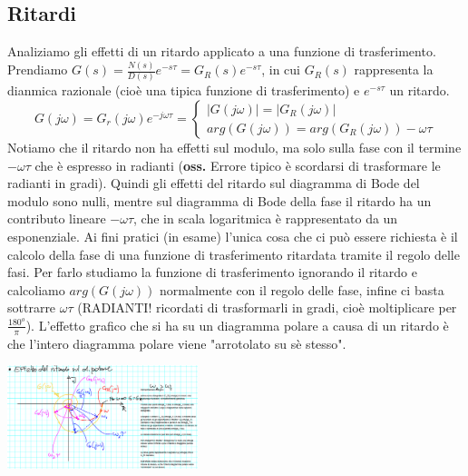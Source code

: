 \begin{landscape}
\begin{multicols*}{3}
    \subsection*{Ritardi}
    Analiziamo gli effetti di un ritardo applicato a una funzione di trasferimento. Prendiamo $G(s) = \frac{N(s)}{D(s)} e^{-s \tau} = G_R(s) e^{-s \tau}$, in cui $G_R(s)$ rappresenta la dianmica razionale (cioè una tipica funzione di trasferimento) e $e^{-s \tau}$ un ritardo.
        \[
            G(j \omega) = G_r(j \omega) e^{- j \omega \tau} = \begin{cases}
                |G(j \omega)| = |G_R(j \omega)|\\
                arg(G(j \omega)) = arg(G_R(j \omega)) - \omega \tau
            \end{cases}
        \]
        Notiamo che il ritardo non ha effetti sul modulo, ma solo sulla fase con il termine $- \omega \tau$ che è espresso in radianti (\textbf{oss.} Errore tipico è scordarsi di trasformare le radianti in gradi).\newline
        Quindi gli effetti del ritardo sul diagramma di Bode del modulo sono nulli, mentre sul diagramma di Bode della fase il ritardo ha un contributo lineare $- \omega \tau$, che in scala logaritmica è rappresentato da un esponenziale.\newline
        \newline
        Ai fini pratici (in esame) l'unica cosa che ci può essere richiesta è il calcolo della fase di una funzione di trasferimento ritardata tramite il regolo delle fasi. Per farlo studiamo la funzione di trasferimento ignorando il ritardo e calcoliamo $arg(G(j \omega))$ normalmente con il regolo delle fase, infine ci basta sottrarre $\omega \tau$ (RADIANTI! ricordati di trasformarli in gradi, cioè moltiplicare per $\frac{180^o}{\pi}$). \newline
        \newline
        L'effetto grafico che si ha su un diagramma polare a causa di un ritardo è che l'intero diagramma polare viene "arrotolato su sè stesso".
        \begin{center}
            \includegraphics[height=3cm]{../lezione17/img2.PNG}

\end{center}
\end{multicols*}
\end{landscape}
